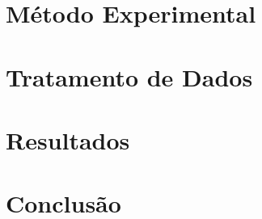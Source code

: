 \documentclass[12pt,openright,oneside,a4paper,brazil]{abntex2}
\begin{document}
\lipsum[1-2]





\chapter{Método Experimental}
\label{cap:metodologia}

\lipsum[3-5]
\lipsum[3-4]
\lipsum[3-4]



\chapter{Tratamento de Dados}
\label{cap:dados}

\lipsum[3-5]





\chapter{Resultados}
\label{cap:resultados}

\lipsum[3-4]
\lipsum[4-5]





\chapter{Conclusão}
\label{cap:conclusao}

\lipsum[2-3]



\postextual



\end{document}
